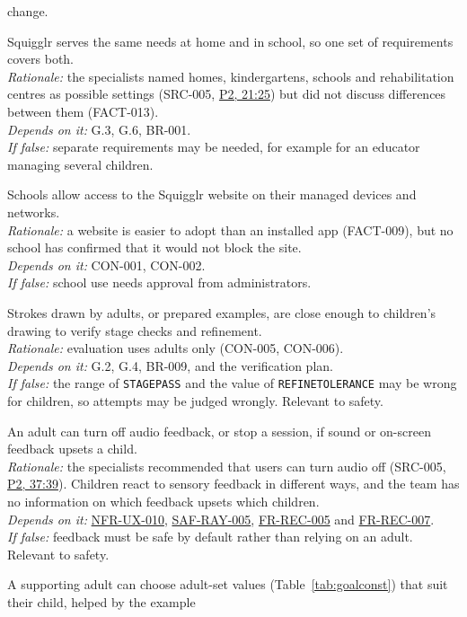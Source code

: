 \documentclass[12pt]{article}
\renewcommand{\_}{\textunderscore\allowbreak}%
\newcommand{\intlink}[3]{\hyperref[int:#1-#2]{#3}}
\newcommand{\intref}[2]{\intlink{#1}{#2}{#1, #2}}
\newcommand{\reqref}[1]{\hyperref[req:#1]{#1}}
\begin{document}
\begin{description}[style=nextline]
change.
\item[ASM-012] Squigglr serves the same needs at home and in school, so one set
of requirements covers both.\\
\emph{Rationale:} the specialists named homes, kindergartens, schools and
rehabilitation centres as possible settings (SRC-005, \intref{P2}{21:25}) but
did not discuss differences between them (FACT-013).\\
\emph{Depends on it:} G.3, G.6, BR-001.\\
\emph{If false:} separate requirements may be needed, for example for an
educator managing several children.
\item[ASM-013] Schools allow access to the Squigglr website on their managed
devices and networks.\\
\emph{Rationale:} a website is easier to adopt than an installed app (FACT-009),
but no school has confirmed that it would not block the site.\\
\emph{Depends on it:} CON-001, CON-002.\\
\emph{If false:} school use needs approval from administrators.
\item[ASM-014] Strokes drawn by adults, or prepared examples, are close enough
to children's drawing to verify stage checks and refinement.\\
\emph{Rationale:} evaluation uses adults only (CON-005, CON-006).\\
\emph{Depends on it:} G.2, G.4, BR-009, and the verification plan.\\
\emph{If false:} the range of \texttt{STAGE\_PASS} and the value of
\texttt{REFINE\_TOLERANCE} may be wrong for children, so attempts may be judged
wrongly. Relevant to safety.
\item[ASM-015] An adult can turn off audio feedback, or stop a session, if sound
or on-screen feedback upsets a child.\\
\emph{Rationale:} the specialists recommended that users can turn audio off
(SRC-005, \intref{P2}{37:39}). Children react to sensory feedback in different
ways, and the team has no information on which feedback upsets which children.\\
\emph{Depends on it:} \reqref{NFR-UX-010}, \reqref{SAF-RAY-005},
\reqref{FR-REC-005} and \reqref{FR-REC-007}.\\
\emph{If false:} feedback must be safe by default rather than relying on an
adult. Relevant to safety.
\item[ASM-016] A supporting adult can choose adult-set values
(Table~\ref{tab:goalconst}) that suit their child, helped by the example

\end{description}
\end{document}
